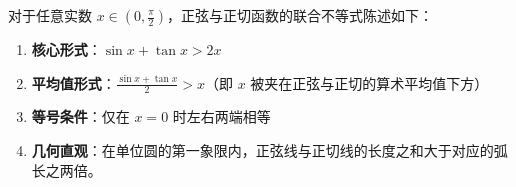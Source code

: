 \begin{statementbox}
对于任意实数 $x \in (0, \frac{\pi}{2})$，正弦与正切函数的联合不等式陈述如下：
\begin{enumerate}
    \item \textbf{核心形式}：$\sin x + \tan x > 2x$
    \item \textbf{平均值形式}：$\frac{\sin x + \tan x}{2} > x$（即 $x$ 被夹在正弦与正切的算术平均值下方）
    \item \textbf{等号条件}：仅在 $x = 0$ 时左右两端相等
    \item \textbf{几何直观}：在单位圆的第一象限内，正弦线与正切线的长度之和大于对应的弧长之两倍。
\end{enumerate}
\end{statementbox}